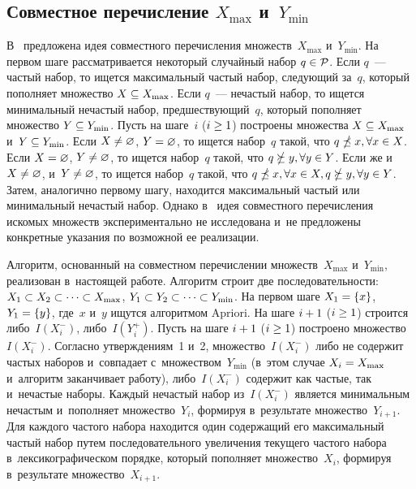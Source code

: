 \begin{multicols}{2}
    \subsection{Совместное перечисление $X_{\max}$ и~$Y_{\min}$}

    В~\cite{9} предложена идея совместного перечисления множеств~$X_{\max}$ и~$Y_{\min}$. 
    На первом шаге рас\-смат\-ри\-ва\-ет\-ся некоторый случайный набор $q \hm\in \mathcal{P}$. Если $q$~--- 
    час\-тый набор, то ищется максимальный час\-тый набор, сле\-ду\-ющий за~$q$, 
    который пополняет множество $X \hm\subseteq X_{\max}$. Если $q$~---
     не\-час\-тый набор, то ищется минимальный не\-час\-тый набор, пред\-шест\-ву\-ющий~$q$, 
     который пополняет множество $Y \hm\subseteq Y_{\min}$. Пусть на шаге~$i$ ($i\hm \geq 1$) 
     построены множества $X \hm\subseteq X_{\max}$ и~$Y \hm\subseteq Y_{\min}$. Если $X \hm\neq \varnothing$, 
     $Y \hm= \varnothing$, то ищется набор~$q$ такой, что $q \hm\npreceq x, \forall x \hm\in X$. Если 
     $X \hm= \varnothing$, $Y \hm\neq \varnothing$, то ищется набор~$q$ такой, что 
     $q \hm\nsucceq y, \forall y \hm\in Y$. Если же и~$X \hm\neq \varnothing$, и~$Y \hm\neq \varnothing$, 
     то ищется набор~$q$ такой, что $q \hm\npreceq x, \forall x \hm\in X, q \hm\nsucceq y, \forall y \hm\in Y$.
      Затем, аналогично первому шагу, находится максимальный частый или минимальный нечастый набор. 
      Однако в~\cite{9} идея совместного перечисления искомых множеств экспериментально 
      не исследована и~не предложены конкретные указания по воз\-мож\-ной ее реализации.
    
    Алгоритм, основанный на совместном пе\-ре\-чис\-ле\-нии множеств~$X_{\max}$ и~$Y_{\min}$,
     реализован в~на\-сто\-ящей работе. Алгоритм строит две последовательности: $X_1 \hm\subset X_2 
     \subset \dots \subset X_{\max}$, $Y_1\hm \subset Y_2 \subset \dots \subset Y_{\min}$. 
     На первом шаге $X_1 \hm= \{x\}$, $Y_1 \hm= \{y\}$, где~$x$ и~$y$ ищутся алгоритмом Apriori.
      На шаге $i \hm+ 1$ ($i\hm \geq 1$) строится либо~$I(X^{-}_{i})$, либо~$I(Y^{+}_{i})$. Пусть на 
      шаге $i \hm+ 1$ ($i \hm\geq 1$) построено множество~$I(X^{-}_{i})$. 
      Согласно утверждениям~1 и~2, множество~$I(X^{-}_{i})$ либо не содержит час\-тых наборов 
      и~совпадает с~множеством~$Y_{\min}$ (в~этом случае $X_i \hm= X_{\max}$ 
      и~алгоритм заканчивает работу), либо~$I(X^{-}_{i})$ содержит как час\-тые, так и~не\-час\-тые наборы. 
      Каждый нечастый набор из~$I(X^{-}_{i})$ является минимальным не\-час\-тым и~пополняет множество~$Y_{i}$, 
      формируя в~результате множество~$Y_{i+1}$. Для каждого час\-то\-го набора находится один содержащий 
      его максимальный час\-тый набор путем последовательного увеличения текущего 
      частого набора в~лексикографическом порядке, который пополняет множество~$X_{i}$, 
      формируя в~результате множество~$X_{i+1}$.
      

\end{multicols}
